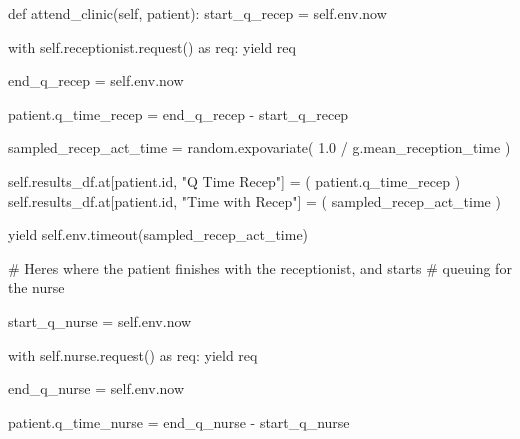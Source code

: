 \documentclass[
  letterpaper,
  DIV=11,
  numbers=noendperiod]{scrreprt}
\newenvironment{Shaded}{\begin{snugshade}}{\end{snugshade}}
\newcommand{\BuiltInTok}[1]{\textcolor[rgb]{0.00,0.23,0.31}{#1}}
\newcommand{\CommentTok}[1]{\textcolor[rgb]{0.37,0.37,0.37}{#1}}
\newcommand{\ControlFlowTok}[1]{\textcolor[rgb]{0.00,0.23,0.31}{#1}}
\newcommand{\FloatTok}[1]{\textcolor[rgb]{0.68,0.00,0.00}{#1}}
\newcommand{\ImportTok}[1]{\textcolor[rgb]{0.00,0.46,0.62}{#1}}
\newcommand{\KeywordTok}[1]{\textcolor[rgb]{0.00,0.23,0.31}{#1}}
\newcommand{\NormalTok}[1]{\textcolor[rgb]{0.00,0.23,0.31}{#1}}
\newcommand{\OperatorTok}[1]{\textcolor[rgb]{0.37,0.37,0.37}{#1}}
\newcommand{\StringTok}[1]{\textcolor[rgb]{0.13,0.47,0.30}{#1}}
\newcommand{\VariableTok}[1]{\textcolor[rgb]{0.07,0.07,0.07}{#1}}
\begin{document}
\begin{Shaded}
\begin{Highlighting}[]
\KeywordTok{def}\NormalTok{ attend\_clinic(}\VariableTok{self}\NormalTok{, patient):}
\NormalTok{        start\_q\_recep }\OperatorTok{=} \VariableTok{self}\NormalTok{.env.now}

        \ControlFlowTok{with} \VariableTok{self}\NormalTok{.receptionist.request() }\ImportTok{as}\NormalTok{ req:}
            \ControlFlowTok{yield}\NormalTok{ req}

\NormalTok{            end\_q\_recep }\OperatorTok{=} \VariableTok{self}\NormalTok{.env.now}

\NormalTok{            patient.q\_time\_recep }\OperatorTok{=}\NormalTok{ end\_q\_recep }\OperatorTok{{-}}\NormalTok{ start\_q\_recep}

\NormalTok{            sampled\_recep\_act\_time }\OperatorTok{=}\NormalTok{ random.expovariate(}
                \FloatTok{1.0} \OperatorTok{/}\NormalTok{ g.mean\_reception\_time}
\NormalTok{            )}

            \VariableTok{self}\NormalTok{.results\_df.at[patient.}\BuiltInTok{id}\NormalTok{, }\StringTok{"Q Time Recep"}\NormalTok{] }\OperatorTok{=}\NormalTok{ (}
\NormalTok{                 patient.q\_time\_recep}
\NormalTok{            )}
            \VariableTok{self}\NormalTok{.results\_df.at[patient.}\BuiltInTok{id}\NormalTok{, }\StringTok{"Time with Recep"}\NormalTok{] }\OperatorTok{=}\NormalTok{ (}
\NormalTok{                 sampled\_recep\_act\_time}
\NormalTok{            )}

            \ControlFlowTok{yield} \VariableTok{self}\NormalTok{.env.timeout(sampled\_recep\_act\_time)}

        \CommentTok{\# Here\textquotesingle{}s where the patient finishes with the receptionist, and starts}
        \CommentTok{\# queuing for the nurse}

\NormalTok{        start\_q\_nurse }\OperatorTok{=} \VariableTok{self}\NormalTok{.env.now}

        \ControlFlowTok{with} \VariableTok{self}\NormalTok{.nurse.request() }\ImportTok{as}\NormalTok{ req:}
            \ControlFlowTok{yield}\NormalTok{ req}

\NormalTok{            end\_q\_nurse }\OperatorTok{=} \VariableTok{self}\NormalTok{.env.now}

\NormalTok{            patient.q\_time\_nurse }\OperatorTok{=}\NormalTok{ end\_q\_nurse }\OperatorTok{{-}}\NormalTok{ start\_q\_nurse}


\end{Highlighting}
\end{Shaded}
\end{document}
